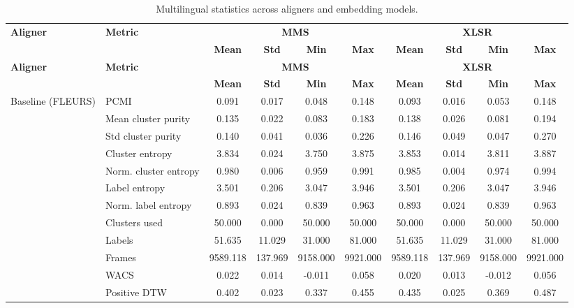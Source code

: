\begingroup
\scriptsize
\setlength{\tabcolsep}{2.5pt}
\begin{longtable}{lp{2.8cm}cccccccc}
\caption{Multilingual statistics across aligners and embedding models.}\label{tab:multilingual-stats}\\
\toprule
\multirow{2}{*}{\textbf{Aligner}} & \multirow{2}{*}{\textbf{Metric}} & \multicolumn{4}{c}{\textbf{MMS}} & \multicolumn{4}{c}{\textbf{XLSR}} \\
\cmidrule(lr){3-6}\cmidrule(lr){7-10}
& & \textbf{Mean} & \textbf{Std} & \textbf{Min} & \textbf{Max} & \textbf{Mean} & \textbf{Std} & \textbf{Min} & \textbf{Max} \\
\midrule
\endfirsthead
\toprule
\multirow{2}{*}{\textbf{Aligner}} & \multirow{2}{*}{\textbf{Metric}} & \multicolumn{4}{c}{\textbf{MMS}} & \multicolumn{4}{c}{\textbf{XLSR}} \\
\cmidrule(lr){3-6}\cmidrule(lr){7-10}
& & \textbf{Mean} & \textbf{Std} & \textbf{Min} & \textbf{Max} & \textbf{Mean} & \textbf{Std} & \textbf{Min} & \textbf{Max} \\
\midrule
\endhead
\midrule
\endfoot
\endlastfoot
Baseline (FLEURS) & PCMI & 0.091 & 0.017 & 0.048 & 0.148 & 0.093 & 0.016 & 0.053 & 0.148 \\
 & Mean cluster purity & 0.135 & 0.022 & 0.083 & 0.183 & 0.138 & 0.026 & 0.081 & 0.194 \\
 & Std cluster purity & 0.140 & 0.041 & 0.036 & 0.226 & 0.146 & 0.049 & 0.047 & 0.270 \\
 & Cluster entropy & 3.834 & 0.024 & 3.750 & 3.875 & 3.853 & 0.014 & 3.811 & 3.887 \\
 & Norm. cluster entropy & 0.980 & 0.006 & 0.959 & 0.991 & 0.985 & 0.004 & 0.974 & 0.994 \\
 & Label entropy & 3.501 & 0.206 & 3.047 & 3.946 & 3.501 & 0.206 & 3.047 & 3.946 \\
 & Norm. label entropy & 0.893 & 0.024 & 0.839 & 0.963 & 0.893 & 0.024 & 0.839 & 0.963 \\
 & Clusters used & 50.000 & 0.000 & 50.000 & 50.000 & 50.000 & 0.000 & 50.000 & 50.000 \\
 & Labels & 51.635 & 11.029 & 31.000 & 81.000 & 51.635 & 11.029 & 31.000 & 81.000 \\
 & Frames & 9589.118 & 137.969 & 9158.000 & 9921.000 & 9589.118 & 137.969 & 9158.000 & 9921.000 \\
 & WACS & 0.022 & 0.014 & -0.011 & 0.058 & 0.020 & 0.013 & -0.012 & 0.056 \\
 & Positive DTW & 0.402 & 0.023 & 0.337 & 0.455 & 0.435 & 0.025 & 0.369 & 0.487 \\

\end{longtable}
